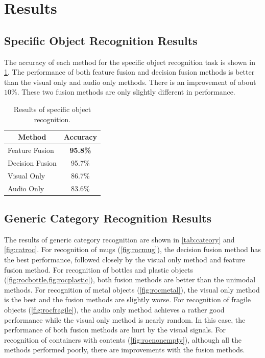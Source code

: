 \documentclass[letterpaper, 10 pt, conference]{ieeeconf}
\begin{document}
\section{Results}
\subsection{Specific Object Recognition Results}
The accuracy of each method for the specific object recognition task is shown in \cref{tab:spec}. The performance of both feature fusion and decision fusion methods is better than the visual only and audio only methods. There is an improvement of about $10\%$. These two fusion methods are only slightly different in performance.

\begin{table}
  \caption{Results of specific object recognition.}
  \label{tab:spec}
  \centering
  \begin{tabular}[h!]{lc}
    \toprule
    \multicolumn{1}{c}{Method} & Accuracy \\ \midrule
    Feature Fusion & \textbf{95.8\%} \\
    Decision Fusion  & 95.7\% \\
    Visual Only & 86.7\% \\
    Audio Only & 83.6\% \\
    \bottomrule
  \end{tabular}
\end{table}

\subsection{Generic Category Recognition Results}
The results of generic category recognition are shown in \cref{tab:cateory} and \cref{fig:catroc}. For recognition of mugs (\cref{fig:rocmug}), the decision fusion method has the best performance, followed closely by the visual only method and feature fusion method. For recognition of bottles and plastic objects (\cref{fig:rocbottle,fig:rocplastic}), both fusion methods are better than the unimodal methods. For recognition of metal objects (\cref{fig:rocmetal}), the visual only method is the best and the fusion methods are slightly worse. For recognition of fragile objects (\cref{fig:rocfragile}), the audio only method achieves a rather good performance while the visual only method is nearly random. In this case, the performance of both fusion methods are hurt by the visual signals. For recognition of containers with contents (\cref{fig:rocnonempty}), although all the methods performed poorly, there are improvements with the fusion methods.
\end{document}
